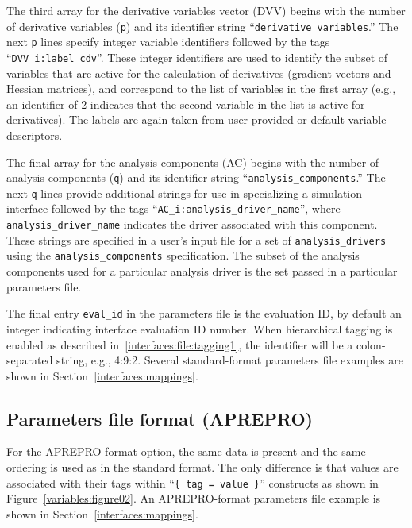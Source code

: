 The third array for the derivative variables vector (DVV) begins with
the number of derivative variables (\texttt{p}) and its identifier
string ``\texttt{derivative\_variables}.'' The next \texttt{p} lines
specify integer variable identifiers followed by the tags
``\texttt{DVV\_i:label\_cdv}''.  These integer identifiers are used to
identify the subset of variables that are active for the calculation
of derivatives (gradient vectors and Hessian matrices), and correspond
to the list of variables in the first array (e.g., an identifier of 2
indicates that the second variable in the list is active for
derivatives).  The labels are again taken from user-provided or
default variable descriptors.

The final array for the analysis components (AC) begins with the
number of analysis components (\texttt{q}) and its identifier string
``\texttt{analysis\_components}.'' The next \texttt{q} lines provide
additional strings for use in specializing a simulation interface
followed by the tags ``\texttt{AC\_i:analysis\_driver\_name}'', where
\texttt{analysis\_driver\_name} indicates the driver associated with
this component.  These strings are specified in a user's input file
for a set of \texttt{analysis\_drivers} using the
\texttt{analysis\_components} specification.  The subset of the
analysis components used for a particular analysis driver is the set
passed in a particular parameters file.

The final entry {\tt eval\_id} in the parameters file is the
evaluation ID, by default an integer indicating interface evaluation
ID number.  When hierarchical tagging is enabled as described
in~\ref{interfaces:file:tagging1}, the identifier will be a
colon-separated string, e.g., 4:9:2.  Several standard-format
parameters file examples are shown in
Section~\ref{interfaces:mappings}.

\subsection{Parameters file format (APREPRO)}\label{variables:parameters:aprepro}

For the APREPRO format option, the same data is present and the same
ordering is used as in the standard format. The only difference is
that values are associated with their tags within ``\texttt{\{ tag =
value \}}'' constructs as shown in Figure~\ref{variables:figure02}.
An APREPRO-format parameters file example is shown in
Section~\ref{interfaces:mappings}.

